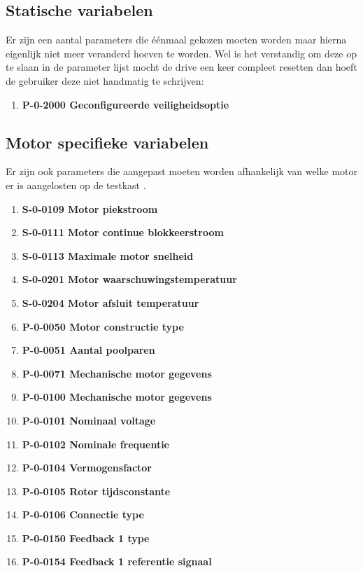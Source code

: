 \subsection{Statische variabelen}

Er zijn een aantal parameters die éénmaal gekozen moeten worden maar hierna eigenlijk niet meer veranderd hoeven te worden. Wel is het verstandig om deze op te slaan in de parameter lijst mocht de drive een keer compleet resetten dan hoeft de gebruiker deze niet handmatig te schrijven:

\begin{enumerate}
	\item \textbf{P-0-2000 Geconfigureerde veiligheidsoptie}
\end{enumerate}

\subsection{Motor specifieke variabelen}

Er zijn ook parameters die aangepast moeten worden afhankelijk van welke motor er is aangelosten op de testkast \cite{web:AX5000IDNDescription}.

\begin{enumerate}
	\item \textbf{S-0-0109 Motor piekstroom}
	\item \textbf{S-0-0111 Motor continue blokkeerstroom}
	\item \textbf{S-0-0113 Maximale motor snelheid}
	\item \textbf{S-0-0201 Motor waarschuwingstemperatuur}
	\item \textbf{S-0-0204 Motor afsluit temperatuur}
	\item \textbf{P-0-0050 Motor constructie type}
	
	\item \textbf{P-0-0051 Aantal poolparen}
	\item \textbf{P-0-0071 Mechanische motor gegevens}
	\item \textbf{P-0-0100 Mechanische motor gegevens}
	\item \textbf{P-0-0101 Nominaal voltage}
	\item \textbf{P-0-0102 Nominale frequentie}
	\item \textbf{P-0-0104 Vermogensfactor}
	\item \textbf{P-0-0105 Rotor tijdsconstante}
	\item \textbf{P-0-0106 Connectie type}
	\item \textbf{P-0-0150 Feedback 1 type}
	\item \textbf{P-0-0154 Feedback 1 referentie signaal}
\end{enumerate}

